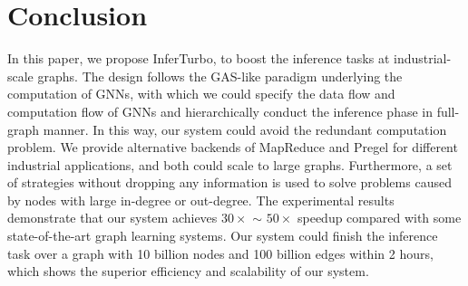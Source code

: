 \documentclass[conference]{IEEEtran}
\begin{document}






\section{Conclusion}
In this paper, we propose InferTurbo, to boost the inference tasks at industrial-scale graphs.
The design follows the GAS-like paradigm underlying the computation of GNNs, with which we could specify the data flow and computation flow of GNNs and hierarchically conduct the inference phase in full-graph manner.
In this way, our system could avoid the redundant computation problem.
We provide alternative backends of MapReduce and Pregel for different industrial applications, and both could scale to large graphs.
Furthermore, a set of strategies without dropping any information is used to solve problems caused by nodes with large in-degree or out-degree.
The experimental results demonstrate that our system achieves $30\times$ $\sim$ $50\times$ speedup compared with some state-of-the-art graph learning systems. Our system could finish the inference task over a graph with 10 billion nodes and 100 billion edges within 2 hours, which shows the superior efficiency and scalability of our system. 
\end{document}
